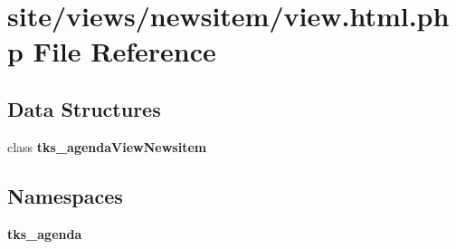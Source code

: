 \section{site/views/newsitem/view.html.\+php File Reference}
\label{site_2views_2newsitem_2view_8html_8php}
\subsection*{Data Structures}
\begin{DoxyCompactItemize}
\item 
class \textbf{ tks\+\_\+agenda\+View\+Newsitem}
\end{DoxyCompactItemize}
\subsection*{Namespaces}
\begin{DoxyCompactItemize}
\item 
 \textbf{ tks\+\_\+agenda}
\end{DoxyCompactItemize}
